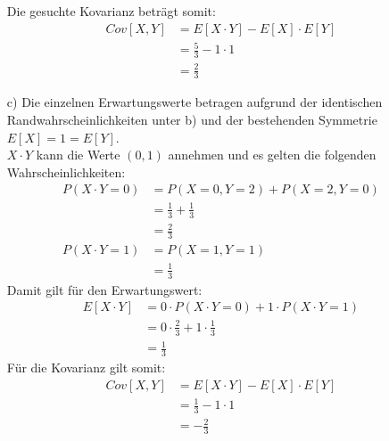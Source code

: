 \begin{enumerate}
\begin{equation*}
	\end{equation*}
	Die gesuchte Kovarianz beträgt somit:
	\begin{equation*}
		\begin{split}
			Cov[X,Y]	&= E[X\cdot Y] - E[X] \cdot E[Y]\\
						&= \frac{5}{3} - 1 \cdot 1\\
						&= \frac{2}{3}
		\end{split}
	\end{equation*}
	\item[c)] Die einzelnen Erwartungswerte betragen aufgrund der identischen Randwahrscheinlichkeiten unter b) und der bestehenden Symmetrie $E[X] = 1 = E[Y]$.\\
	$X \cdot Y$ kann die Werte $(0,1)$ annehmen und es gelten die folgenden Wahrscheinlichkeiten:
	\begin{equation*}
		\begin{split}
			P(X \cdot Y = 0)	&= P(X = 0, Y = 2) + P(X = 2, Y = 0)\\
								&= \frac{1}{3} + \frac{1}{3}\\
								&= \frac{2}{3}\\
			P(X \cdot Y = 1)	&= P(X = 1, Y = 1)\\
								&= \frac{1}{3}
		\end{split}
	\end{equation*}
	Damit gilt für den Erwartungswert:
	\begin{equation*}
		\begin{split}
			E[X \cdot Y]	&= 0 \cdot P(X \cdot Y = 0) + 1 \cdot P(X \cdot Y = 1)\\
							&= 0 \cdot \frac{2}{3} + 1 \cdot \frac{1}{3}\\
							&= \frac{1}{3}
		\end{split}
	\end{equation*}
	Für die Kovarianz gilt somit:\\
	\begin{equation*}
		\begin{split}
			Cov[X,Y]	&= E[X\cdot Y] - E[X] \cdot E[Y]\\
						&= \frac{1}{3} - 1 \cdot 1\\
						&= - \frac{2}{3}
		\end{split}
	\end{equation*}
\end{enumerate}